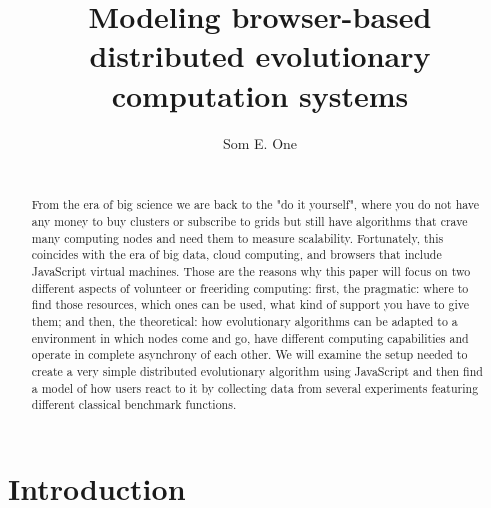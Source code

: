 \documentclass{sig-alternate}
\begin{document}
\title{Modeling browser-based distributed evolutionary computation systems} 

%
\author{
%
%
\alignauthor
Som E. One\\
       \\
}


\maketitle

\begin{abstract}
From the era of big science we are back to the "do it yourself", where
you do not have any money to buy clusters or subscribe to grids but
still have algorithms that crave many computing nodes and need them to
measure scalability. Fortunately, this coincides with the era of big
data, cloud computing, and browsers that include JavaScript virtual
machines. Those are the reasons why this paper will focus on two
different aspects of volunteer or freeriding computing: first, the
pragmatic: where to find those resources, which ones can be used, what
kind of support you have to give them; and then, the theoretical: how
evolutionary algorithms can be adapted to a environment in which nodes
come and go, have different computing capabilities and operate in
complete asynchrony of each other. We will examine the setup needed to
create a very simple distributed evolutionary algorithm using
JavaScript and then find a model of how users react to it by
collecting data from several experiments featuring different classical
benchmark functions. 
\end{abstract}


\section{Introduction}
\end{document}
